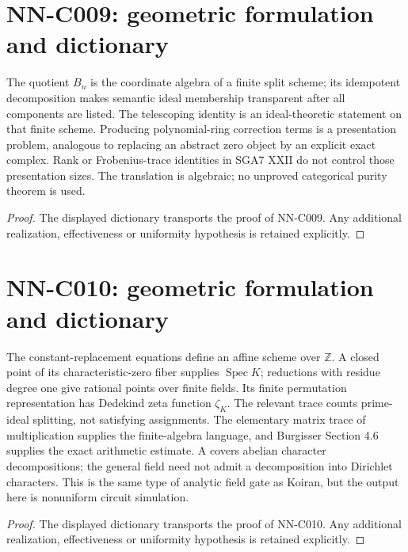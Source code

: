 \section{NN-C009: geometric formulation and dictionary}
\begin{geometricstatement}[NN-C009]
The quotient $B_n$ is the coordinate algebra of a finite split scheme; its idempotent decomposition makes semantic ideal membership transparent after all components are listed. The telescoping identity is an ideal-theoretic statement on that finite scheme. Producing polynomial-ring correction terms is a presentation problem, analogous to replacing an abstract zero object by an explicit exact complex. Rank or Frobenius-trace identities in SGA7 XXII do not control those presentation sizes. The translation is algebraic; no unproved categorical purity theorem is used.
\end{geometricstatement}
\begin{proof} The displayed dictionary transports the proof of NN-C009. Any additional realization, effectiveness or uniformity hypothesis is retained explicitly.\end{proof}


\section{NN-C010: geometric formulation and dictionary}
\begin{geometricstatement}[NN-C010]
The constant-replacement equations define an affine scheme over $\mathbb Z$. A closed point of its characteristic-zero fiber supplies $\operatorname{Spec}K$; reductions with residue degree one give rational points over finite fields. Its finite permutation representation has Dedekind zeta function $\zeta_K$. The relevant trace counts prime-ideal splitting, not satisfying assignments. The elementary matrix trace of multiplication supplies the finite-algebra language, and Burgisser Section 4.6 supplies the exact arithmetic estimate. A covers abelian character decompositions; the general field need not admit a decomposition into Dirichlet characters. This is the same type of analytic field gate as Koiran, but the output here is nonuniform circuit simulation.
\end{geometricstatement}
\begin{proof} The displayed dictionary transports the proof of NN-C010. Any additional realization, effectiveness or uniformity hypothesis is retained explicitly.\end{proof}


